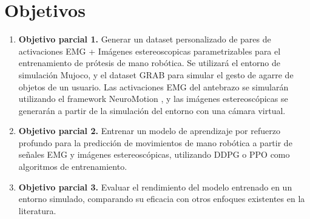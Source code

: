 
\cleardoublepage

\chapter{Objetivos}
\label{objetivos}



\medskip
\begin{enumerate}[label=\destacado{\arabic*.}]
  \setlength\itemsep{1em}
  \item \textbf{Objetivo parcial 1.} Generar un dataset personalizado de pares de activaciones EMG + Imágenes estereoscopicas parametrizables para el entrenamiento de prótesis de mano robótica.
    Se utilizará el entorno de simulación Mujoco, y el dataset GRAB para simular el gesto de agarre de objetos de un usuario. Las activaciones EMG del antebrazo se simularán utilizando el framework NeuroMotion \citep{ma2023neuromotion}, y las imágenes estereoscópicas se generarán a partir de la simulación del entorno con una cámara virtual.

  \item \textbf{Objetivo parcial 2.} Entrenar un modelo de aprendizaje por refuerzo profundo para la
    predicción de movimientos de mano robótica a partir de señales EMG y imágenes estereoscópicas, utilizando DDPG o PPO como algoritmos de entrenamiento.

  \item \textbf{Objetivo parcial 3.} Evaluar el rendimiento del modelo entrenado en un entorno simulado, comparando su eficacia con otros enfoques existentes en la literatura.
\end{enumerate}
